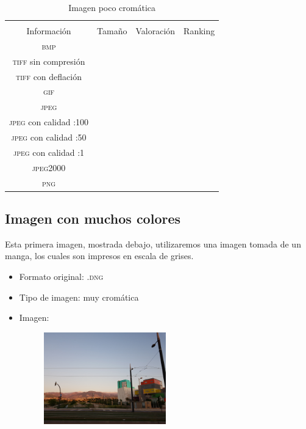 \documentclass[11pt,a4paper]{article}
\begin{document}
\begin{table}[H]
\centering
\begin{tabular}{|c|c|c|c|}
\hline
\diagbox[width=15em]{\textit{Códec}/Formato}{\\Información} & Tamaño & Valoración & Ranking \\
\hline
\textsc{bmp} &  &  &  \\ \hline
\textsc{tiff} sin compresión &  &  &  \\ \hline
\textsc{tiff} con deflación &  &  &  \\ \hline
\textsc{gif} &  &  &  \\ \hline
\textsc{jpeg} &  &  &  \\ \hline
\textsc{jpeg} con calidad :100 &  &  &  \\ \hline
\textsc{jpeg} con calidad :50 &  &  &  \\ \hline
\textsc{jpeg} con calidad :1 &  &  &  \\ \hline
\textsc{jpeg2000} &  &  &  \\ \hline
\textsc{png} &  &  &  \\ \hline
\end{tabular}
\caption{Imagen poco cromática}
\label{tab:my-table}
\end{table}


\subsection{Imagen con muchos colores}

Esta primera imagen, mostrada debajo, utilizaremos una imagen tomada de un manga, los cuales son impresos en escala de grises.

\begin{itemize}
	\item Formato original: \textsc{.dng}
	\item Tipo de imagen: muy cromática
	\item Imagen:
		\begin{figure}[H]
		\centering
			\includegraphics[width=0.5\textwidth]{Fotos/crom.jpg}
		\end{figure}	
\end{itemize}
\end{document}
